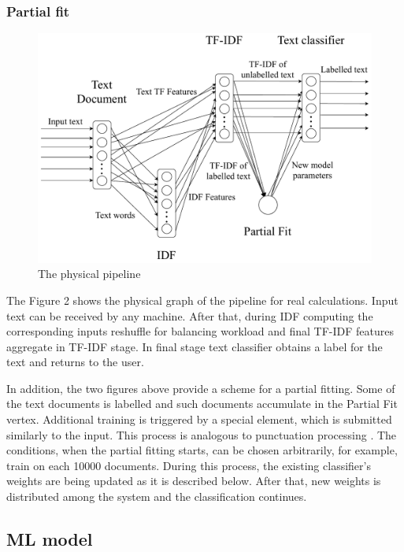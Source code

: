 \subsubsection{Partial fit}

\begin{figure}[htbp]
  \centering
  \includegraphics[scale=0.375]{pics/physical-graph}
  \caption{The physical pipeline}
  \label {physical graph}
\end{figure}

The Figure 2 shows the physical graph of the pipeline for real calculations. Input text can be received by any machine. After that, during IDF computing the corresponding inputs reshuffle for balancing workload and final TF-IDF features aggregate in TF-IDF stage. In final stage text classifier obtains a label for the text and returns to the user.

In addition, the two figures above provide a scheme for a partial fitting. Some of the text documents is labelled and such documents accumulate in the Partial Fit vertex. Additional training is triggered by a special element, which is submitted similarly to the input. This process is analogous to punctuation processing \cite{tucker2003exploiting}. The conditions, when the partial fitting starts, can be chosen arbitrarily, for example, train on each 10000 documents. During this process, the existing classifier's weights are being updated as it is described below. After that, new weights is distributed among the system and the classification continues. 

\subsection{ML model}

